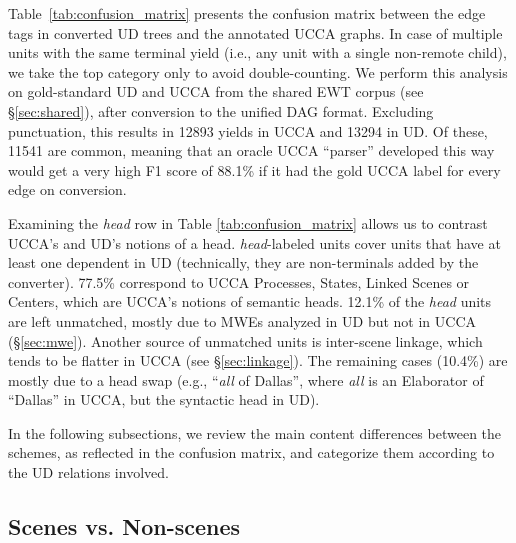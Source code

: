 \documentclass[11pt,a4paper]{article}
\begin{document}
Table~\ref{tab:confusion_matrix} presents the confusion matrix between the edge tags in converted UD trees
and the annotated UCCA graphs.
In case of multiple units with the same terminal yield (i.e., any unit with a single non-remote child),
we take the top category only to avoid double-counting.
We perform this analysis on gold-standard UD and UCCA from the shared EWT corpus
(see \S\ref{sec:shared}),
after conversion to the unified DAG format.
Excluding punctuation, this results in 12893 yields in UCCA and
13294 in UD.
Of these, 11541 are common, meaning that an oracle UCCA ``parser'' developed this way
would get a very high F1 score
of 88.1\% if it had the gold UCCA label for every edge on conversion.

Examining the {\it head} row in Table \ref{tab:confusion_matrix} allows
us to contrast UCCA's and UD's notions of a head. 
{\it head}-labeled units cover units that have at least
one dependent in UD (technically, they are non-terminals added by the converter).
77.5\% correspond to UCCA Processes, States, Linked Scenes or Centers,
which are UCCA's notions of semantic heads.
12.1\% of the {\it head} units are left unmatched, mostly due to MWEs analyzed in
UD but not in UCCA (\S\ref{sec:mwe}).
Another source of unmatched units is inter-scene linkage, which tends to be flatter in
UCCA (see \S\ref{sec:linkage}).
The remaining cases (10.4\%) are mostly due to a head swap (e.g., ``\textit{all} of Dallas'', where \textit{all} 
is an Elaborator of ``Dallas'' in UCCA, but the syntactic head in UD).

In the following subsections, we review the main content differences between the schemes,
as reflected in the confusion matrix, and categorize them according to the UD relations
involved.


\subsection{Scenes vs. Non-scenes}\label{sec:scenes}
\end{document}
